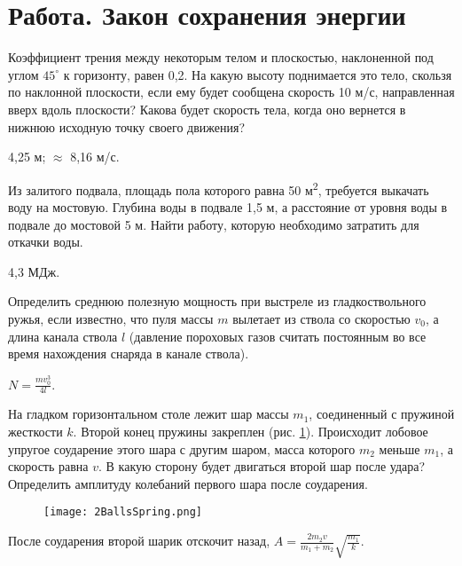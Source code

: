 \section{Работа. Закон сохранения энергии}

\introProblems

\begin{ex} %
Коэффициент трения между некоторым телом и плоскостью, наклоненной под углом $45^{\circ}$ к горизонту, равен 0,2. На какую высоту поднимается это тело, скользя по наклонной плоскости, если ему будет сообщена скорость 10 м/с, направленная вверх вдоль плоскости? Какова будет скорость тела, когда оно вернется в нижнюю исходную точку своего движения?
\begin{ans}
4,25 м; $\approx$ 8,16 м/с.
\end{ans}
\end{ex}

\begin{ex} %
Из залитого подвала, площадь пола которого равна 50 м\textsuperscript{2}, требуется выкачать воду на мостовую. Глубина воды в подвале 1,5 м, а расстояние от уровня воды в подвале до мостовой 5 м. Найти работу, которую необходимо затратить для откачки воды.
\begin{ans}
4,3 МДж.
\end{ans}
\end{ex}

\begin{ex} %
Определить среднюю полезную мощность при выстреле из гладкоствольного ружья, если известно, что пуля массы $m$ вылетает из ствола со скоростью $v_0$, а длина канала ствола $l$ (давление пороховых газов считать постоянным во все время нахождения снаряда в канале ствола).
\begin{ans}
$N =\frac{mv_{0}^3}{4l}$.
\end{ans}
\end{ex}


\begin{ex} %
На гладком горизонтальном столе лежит шар массы $m_1$, соединенный с пружиной жесткости $k$. Второй конец пружины закреплен (рис. \ref{2BallsSpring}). Происходит лобовое упругое соударение этого шара с другим шаром, масса которого $m_2$ меньше $m_1$, а скорость равна $v$. В какую сторону будет двигаться второй шар после удара? Определить амплитуду колебаний первого шара после соударения.

\begin{figure}[h]
\centering
\texttt{[image: 2BallsSpring.png]}
\caption{}
\label{2BallsSpring}
\end{figure}

\begin{ans}
После соударения второй шарик отскочит назад, $A = \frac{2m_2v}{m_1+m_2}\sqrt{\frac{m_1}{k}}$.
\end{ans}
\end{ex}

